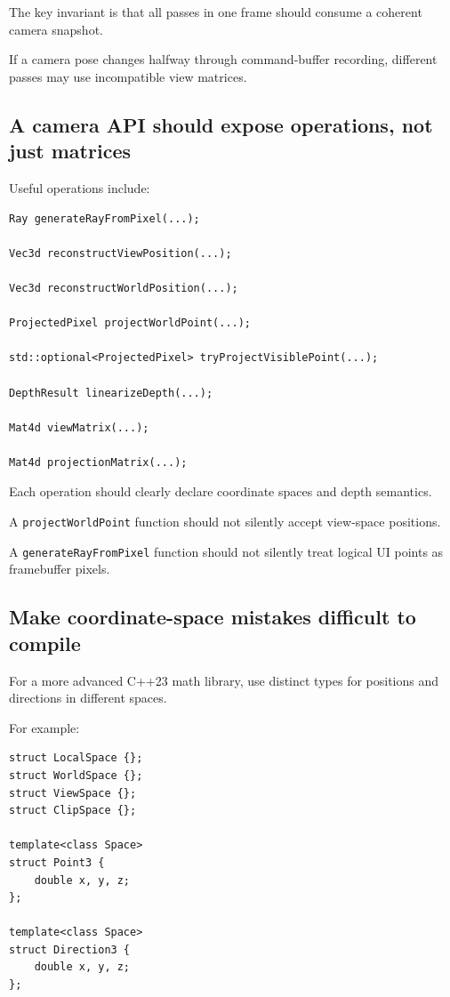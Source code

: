 The key invariant is that all passes in one frame should consume a coherent camera snapshot.

If a camera pose changes halfway through command-buffer recording, different passes may use incompatible view matrices.

\subsection{A camera API should expose operations, not just matrices}\label{02-foundations-ii-ch037-a-camera-api-should-expose-operations-not-just-matrices}

Useful operations include:

\begin{verbatim}
Ray generateRayFromPixel(...);

Vec3d reconstructViewPosition(...);

Vec3d reconstructWorldPosition(...);

ProjectedPixel projectWorldPoint(...);

std::optional<ProjectedPixel> tryProjectVisiblePoint(...);

DepthResult linearizeDepth(...);

Mat4d viewMatrix(...);

Mat4d projectionMatrix(...);
\end{verbatim}

Each operation should clearly declare coordinate spaces and depth semantics.

A \texttt{projectWorldPoint} function should not silently accept view-space positions.

A \texttt{generateRayFromPixel} function should not silently treat logical UI points as framebuffer pixels.

\subsection{Make coordinate-space mistakes difficult to compile}\label{02-foundations-ii-ch037-make-coordinate-space-mistakes-difficult-to-compile}

For a more advanced C++23 math library, use distinct types for positions and directions in different spaces.

For example:

\begin{verbatim}
struct LocalSpace {};
struct WorldSpace {};
struct ViewSpace {};
struct ClipSpace {};

template<class Space>
struct Point3 {
    double x, y, z;
};

template<class Space>
struct Direction3 {
    double x, y, z;
};
\end{verbatim}

